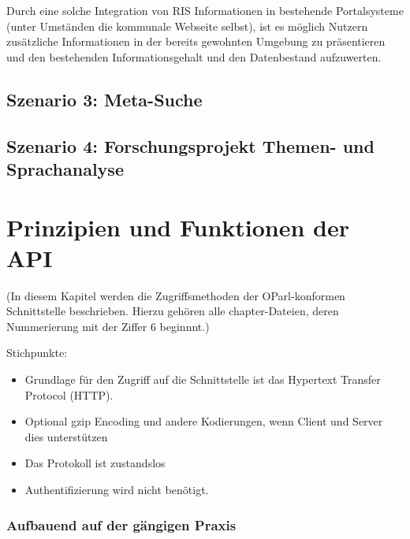 \documentclass[,a4paper]{article}
\begin{document}
Durch eine solche Integration von RIS Informationen in bestehende
Portalsysteme (unter Umständen die kommunale Webseite selbst), ist es
möglich Nutzern zusätzliche Informationen in der bereits gewohnten
Umgebung zu präsentieren und den bestehenden Informationsgehalt und den
Datenbestand aufzuwerten.

\subsection{Szenario 3: Meta-Suche}\label{szenarioux5fmetaux5fsuche}

\subsection{Szenario 4: Forschungsprojekt Themen- und
Sprachanalyse}\label{szenarioux5fforschung}

\section{Prinzipien und Funktionen der
API}\label{prinzipien-und-funktionen-der-api}

(In diesem Kapitel werden die Zugriffsmethoden der OParl-konformen
Schnittstelle beschrieben. Hierzu gehören alle chapter-Dateien, deren
Nummerierung mit der Ziffer 6 beginnnt.)

Stichpunkte:

\begin{itemize}
\itemsep1pt\parskip0pt
\item
  Grundlage für den Zugriff auf die Schnittstelle ist das Hypertext
  Transfer Protocol (HTTP).
\item
  Optional gzip Encoding und andere Kodierungen, wenn Client und Server
  dies unterstützen
\item
  Das Protokoll ist zustandslos
\item
  Authentifizierung wird nicht benötigt.
\end{itemize}


\subsubsection{Aufbauend auf der gängigen
Praxis}\label{aufbauend-auf-der-guxe4ngigen-praxis}
\end{document}
